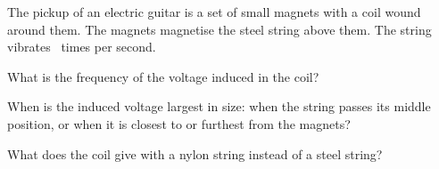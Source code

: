 The pickup of an electric guitar is a set of small magnets with a coil wound around them. The magnets magnetise the steel string above them. The string vibrates \fX\ times per second.

\begin{abcliste}
\abc What is the frequency of the voltage induced in the coil?

\abc When is the induced voltage largest in size: when the string passes its middle position, or when it is closest to or furthest from the magnets?

\abc What does the coil give with a nylon string instead of a steel string?
\end{abcliste}
